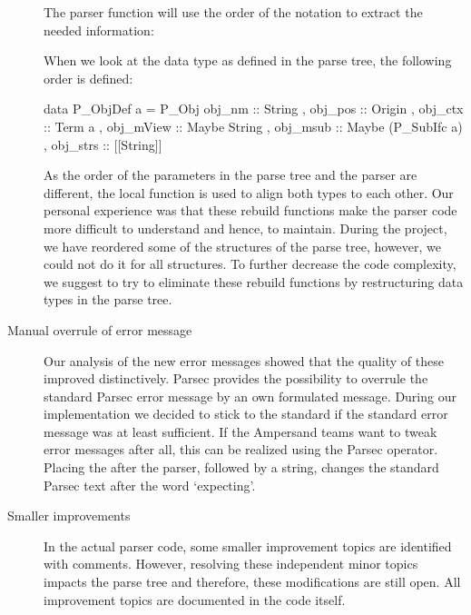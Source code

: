 \begin{description}
   The parser function will use the order of the notation to extract the needed information:
%
   When we look at the data type as defined in the parse tree, the following order is defined:
   \begin{haskell}
   data P_ObjDef a =
      P_Obj { obj_nm :: String          
            , obj_pos :: Origin  
            , obj_ctx :: Term a
            , obj_mView :: Maybe String 
            , obj_msub :: Maybe (P_SubIfc a)  
            , obj_strs :: [[String]]
            }
    \end{haskell}
    As the order of the parameters in the parse tree and the parser are different, the local function  is used to align both types to each other.
   Our personal experience was that these rebuild functions make the parser code more difficult to understand and hence, to maintain.
  During the project, we have reordered some of the structures of the parse tree, however, we could not do it for all structures.
   To further decrease the code complexity, we suggest to try to eliminate these rebuild functions by restructuring data types in the parse tree.

  \item[Manual overrule of error message]
    Our analysis of the new error messages showed that the quality of these improved distinctively.
    Parsec provides the possibility to overrule the standard Parsec error message by an own formulated message.
    During our implementation we decided to stick to the standard if the standard error message was at least sufficient.
    If the Ampersand teams want to tweak error messages after all, this can be realized using the  Parsec operator.
    Placing the  after the parser, followed by a string, changes the standard Parsec text after the word `expecting'.

  \item [Smaller improvements]
    In the actual parser code, some smaller improvement topics are identified with comments.
    However, resolving these independent minor topics impacts the parse tree and therefore, these modifications are still open.
    All improvement topics are documented in the code itself. 
\end{description}
